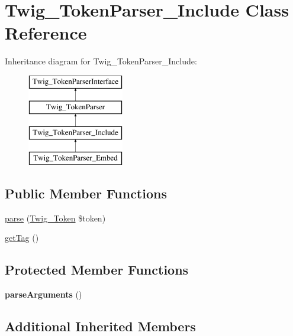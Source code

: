 \hypertarget{class_twig___token_parser___include}{}\section{Twig\+\_\+\+Token\+Parser\+\_\+\+Include Class Reference}
\label{class_twig___token_parser___include}
Inheritance diagram for Twig\+\_\+\+Token\+Parser\+\_\+\+Include\+:\begin{figure}[H]
\begin{center}
\leavevmode
\includegraphics[height=4.000000cm]{class_twig___token_parser___include}
\end{center}
\end{figure}
\subsection*{Public Member Functions}
\begin{DoxyCompactItemize}
\item 
\hyperlink{class_twig___token_parser___include_a5dfa2e269321584fb74e8b43dabe0efd}{parse} (\hyperlink{class_twig___token}{Twig\+\_\+\+Token} \$token)
\item 
\hyperlink{class_twig___token_parser___include_ab86ba36154b20e6bbfa3ba705f12f9d6}{get\+Tag} ()
\end{DoxyCompactItemize}
\subsection*{Protected Member Functions}
\begin{DoxyCompactItemize}
\item 
\hypertarget{class_twig___token_parser___include_a7d9e9372bc6498d076030a4caf7bc188}{}{\bfseries parse\+Arguments} ()\label{class_twig___token_parser___include_a7d9e9372bc6498d076030a4caf7bc188}

\end{DoxyCompactItemize}
\subsection*{Additional Inherited Members}


